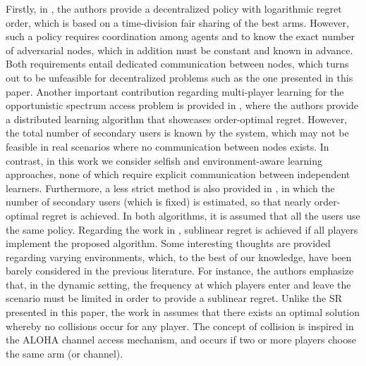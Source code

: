 \documentclass{article}
\begin{document}
Firstly, in \cite{liu2010distributed}, the authors provide a decentralized policy with logarithmic regret order, which is based on a time-division fair sharing of the best arms. However, such a policy requires coordination among agents and to know the exact number of adversarial nodes, which in addition must be constant and known in advance. Both requirements entail dedicated communication between nodes, which turns out to be unfeasible for decentralized problems such as the one presented in this paper. Another important contribution regarding multi-player learning for the opportunistic spectrum access problem is provided in \cite{anandkumar2011distributed}, where the authors provide a distributed learning algorithm that showcases order-optimal regret. However, the total number of secondary users is known by the system, which may not be feasible in real scenarios where no communication between nodes exists. In contrast, in this work we consider selfish and environment-aware learning approaches, none of which require explicit communication between independent learners. Furthermore, a less strict method is also provided in \cite{anandkumar2011distributed}, in which the number of secondary users (which is fixed) is estimated, so that nearly order-optimal regret is achieved. In both algorithms, it is assumed that all the users use the same policy. Regarding the work in \cite{rosenski2016multi}, sublinear regret is achieved if all players implement the proposed algorithm. Some interesting thoughts are provided regarding varying environments, which, to the best of our knowledge, have been barely considered in the previous literature. For instance, the authors emphasize that, in the dynamic setting, the frequency at which players enter and leave the scenario must be limited in order to provide a sublinear regret. Unlike the SR presented in this paper, the work in \cite{rosenski2016multi} assumes that there exists an optimal solution whereby no collisions occur for any player. The concept of collision is inspired in the ALOHA channel access mechanism, and occurs if two or more players choose the same arm (or channel). 
 
\end{document}
